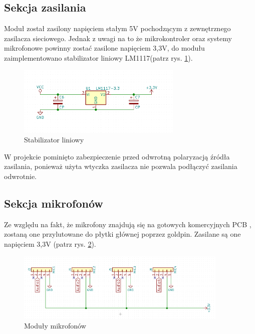 \documentclass[eng,printmode]{mgr}
\begin{document}
\subsection{Sekcja zasilania}
Moduł został zasilony napięciem stałym 5V pochodzącym z zewnętrznego zasilacza sieciowego. Jednak z uwagi na to że mikrokontroler oraz systemy  mikrofonowe powinny zostać zasilone napięciem 3,3V, do modułu zaimplementowano stabilizator liniowy LM1117(patrz rys. \ref{fig-stabilizator}).
\begin{figure}[ht]

    \centering

  \includegraphics[width=0.7\textwidth, angle=0]{zasilanie.png}

    \caption{Stabilizator liniowy}
 \label{fig-stabilizator}
    

\end{figure}

W projekcie pominięto zabezpieczenie przed odwrotną polaryzacją źródła zasilania, ponieważ użyta wtyczka zasilacza nie pozwala podłączyć zasilania odwrotnie.

\subsection{Sekcja mikrofonów}
Ze względu na fakt, że mikrofony znajdują się na gotowych komercyjnych PCB , zostaną one przylutowane do płytki głównej poprzez goldpin. Zasilane są one napięciem 3,3V (patrz rys. \ref{fig-mikrofony}).
\begin{figure}[ht]

    \centering

  \includegraphics[width=0.9\textwidth, angle=0]{mikrofony.png}

    \caption{Moduły mikrofonów}
 \label{fig-mikrofony}
    

\end{figure}
\end{document}
